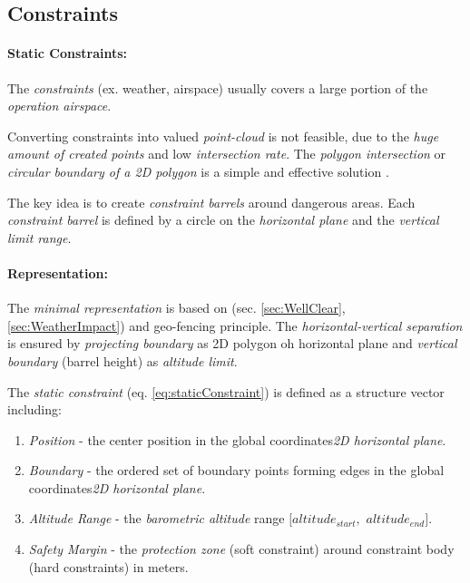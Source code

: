\subsection{Constraints}\label{s:virtualConstraints}
\paragraph{Static Constraints:} The \emph{constraints} (ex. weather, airspace) usually covers a large portion of the \emph{operation airspace}. 

Converting constraints into valued \emph{point-cloud} is not feasible, due to the \emph{huge amount of created points} and low \emph{intersection rate}. The \emph{polygon intersection} or \emph{circular boundary of a 2D polygon} is a simple and effective solution \cite{ritter1990efficient,welzl1991smallest}. 

The key idea is to create \emph{constraint barrels} around dangerous areas. Each \emph{constraint barrel} is defined by a circle on the \emph{horizontal plane} and the \emph{vertical limit range}.

\paragraph{Representation:} The \emph{minimal representation} is based on (sec. \ref{sec:WellClear}, \ref{sec:WeatherImpact}) and geo-fencing principle. The \emph{horizontal-vertical separation} is ensured by \emph{projecting boundary} as 2D polygon oh horizontal plane and \emph{vertical boundary} (barrel height) as \emph{altitude limit}. 

The \emph{static constraint} (eq. \ref{eq:staticConstraint}) is defined as a structure vector including:
\begin{enumerate}
    \item \emph{Position} - the center position in the global coordinates\emph{2D horizontal plane}.
    
    \item \emph{Boundary} - the ordered set of boundary points forming edges in the global coordinates\emph{2D horizontal plane}.
    
    \item \emph{Altitude Range} - the \emph{barometric altitude} range $[altitude_{start},$ $altitude_{end}]$.
    
    \item \emph{Safety Margin} - the \emph{protection zone} (soft constraint) around constraint body (hard constraints) in meters.
\end{enumerate}

